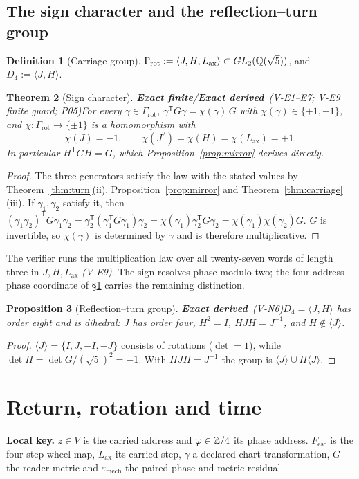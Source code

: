 \documentclass[11pt,a4paper]{article}
\newcommand{\tp}{^{\mathsf T}}
\newcommand{\Lax}{L_{\mathrm{ax}}}\newcommand{\Lpr}{L_{\mathrm{pr}}}
\newcommand{\Fesc}{F_{\mathrm{esc}}}
\newcommand{\emech}{\varepsilon_{\mathrm{mech}}}\newcommand{\eHS}{\varepsilon_{\mathrm{HS}}}
\newcommand{\Grot}{\Gamma_{\mathrm{rot}}}\newcommand{\Dfour}{D_4}
\newcommand{\st}[1]{\textsf{\small\textbf{#1}}}
\newcommand{\Sfin}{\st{Exact finite}}\newcommand{\Sder}{\st{Exact derived}}
\newcommand{\lkey}[1]{\par\noindent\textbf{Local key.} #1\par\smallskip}
\theoremstyle{plain}
\newtheorem{thm}{Theorem}[section]
\newtheorem{prop}[thm]{Proposition}
\theoremstyle{definition}
\newtheorem{defn}[thm]{Definition}
\theoremstyle{remark}
\begin{document}
\subsection{The sign character and the reflection--turn group}
\begin{defn}[Carriage group]
$\Grot:=\langle J,H,\Lax\rangle\subset GL_2(\QQ(\sqrt5))$, and $\Dfour:=\langle J,H\rangle$.
\end{defn}
\begin{thm}[Sign character]\Sfin/\Sder\ \textit{(V-E1--E7; V-E9 finite guard; P05)}\label{thm:chi}
For every $\gamma\in\Grot$, $\gamma\tp G\gamma=\chi(\gamma)\,G$ with $\chi(\gamma)\in\{+1,-1\}$, and $\chi:\Grot\to\{\pm1\}$ is a homomorphism with
\[
\chi(J)=-1,\qquad \chi(J^2)=\chi(H)=\chi(\Lax)=+1 .
\]
In particular $H\tp GH=G$, which Proposition~\ref{prop:mirror} derives directly.
\end{thm}
\begin{proof}
The three generators satisfy the law with the stated values by Theorem~\ref{thm:turn}(ii), Proposition~\ref{prop:mirror} and Theorem~\ref{thm:carriage}(iii). If $\gamma_1,\gamma_2$ satisfy it, then $(\gamma_1\gamma_2)\tp G\gamma_1\gamma_2=\gamma_2\tp(\gamma_1\tp G\gamma_1)\gamma_2=\chi(\gamma_1)\gamma_2\tp G\gamma_2=\chi(\gamma_1)\chi(\gamma_2)G$. $G$ is invertible, so $\chi(\gamma)$ is determined by $\gamma$ and is therefore multiplicative.
\end{proof}
The verifier runs the multiplication law over all twenty-seven words of length three in $J,H,\Lax$ \textit{(V-E9)}. The sign resolves phase modulo two; the four-address phase coordinate of \S\ref{sec:return} carries the remaining distinction.
\begin{prop}[Reflection--turn group]\Sder\ \textit{(V-N6)}\label{prop:d4}
$\Dfour=\langle J,H\rangle$ has order eight and is dihedral: $J$ has order four, $H^2=I$, $HJH=J^{-1}$, and $H\notin\langle J\rangle$.
\end{prop}
\begin{proof}
$\langle J\rangle=\{I,J,-I,-J\}$ consists of rotations ($\det=1$), while $\det H=\det G/(\sqrt5)^2=-1$. With $HJH=J^{-1}$ the group is $\langle J\rangle\cup H\langle J\rangle$.
\end{proof}
\section{Return, rotation and time}\label{sec:return}
\lkey{$z\in V$ is the carried address and $\varphi\in\mathbb{Z}/4$ its phase address. $\Fesc$ is the four-step wheel map, $\Lax$ its carried step, $\gamma$ a declared chart transformation, $G$ the reader metric and $\emech$ the paired phase-and-metric residual.}
\end{document}
